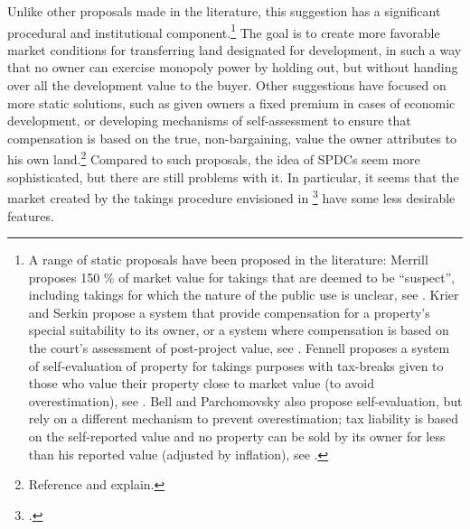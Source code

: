 Unlike other proposals made in the literature, this suggestion has a significant procedural and institutional component.\footnote{A range of static proposals have been proposed in the literature: Merrill proposes 150 \% of market value for takings that are deemed to be ``suspect'', including takings for which the nature of the public use is unclear, see \cite[90-93]{merrill86}. Krier and Serkin propose a system that provide compensation for a property's special suitability to its owner, or a system where compensation is based on the court's assessment of post-project value, see \cite[865-873]{krier04}. Fennell proposes a system of self-evaluation of property for takings purposes with tax-breaks given to those who value their property close to market value (to avoid overestimation), see \cite[995-996]{fennell04}. Bell and Parchomovsky also propose self-evaluation, but rely on a different mechanism to prevent overestimation; tax liability is based on the self-reported value and no property can be sold by its owner for less than his reported value (adjusted by inflation), see \cite[890-900]{bell07}.} The goal is to create more favorable market conditions for transferring land designated for development, in such a way that no owner can exercise monopoly power by holding out, but without handing over all the development value to the buyer. Other suggestions have focused on more static solutions, such as given owners a fixed premium in cases of economic development, or developing mechanisms of self-assessment to ensure that compensation is based on the true, non-bargaining, value the owner attributes to his own land.\footnote{Reference and explain.} Compared to such proposals, the idea of SPDCs seem more sophisticated, but there are still problems with it. In particular, it seems that the market created by the takings procedure envisioned in \footcite{eminc07} have some less desirable features.

